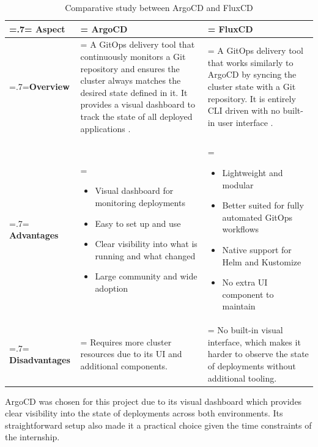 \begin{table}[H]
    \renewcommand{\arraystretch}{1.5}%
    \caption{Comparative study between ArgoCD and FluxCD}
    \centering
    \medskip
    \begin{tabularx}{1\textwidth} {
            | >{\hsize=.7\hsize\linewidth=\hsize\centering\arraybackslash}X
            | >{\hsize=1.15\hsize\linewidth=\hsize\justifying\arraybackslash}X
            | >{\hsize=1.15\hsize\linewidth=\hsize\justifying\arraybackslash}X |}
        \hline
        \rowcolor{primary} \textbf {Aspect} & \textbf{ArgoCD} & \textbf{FluxCD} \\
        \hline
        \textbf {Overview} & \noindent A GitOps delivery tool that continuously monitors a Git repository and ensures the cluster always matches the desired state defined in it. It provides a visual dashboard to track the state of all deployed applications \cite{argocd_docs}. & \noindent A GitOps delivery tool that works similarly to ArgoCD by syncing the cluster state with a Git repository. It is entirely CLI driven with no built-in user interface \cite{fluxcd_docs}. \\
        \hline
        \textbf {Advantages} & \begin{itemize}[leftmargin=*, topsep=0pt, itemsep=1pt, parsep=2pt]
            \item Visual dashboard for monitoring deployments
            \item Easy to set up and use
            \item Clear visibility into what is running and what changed
            \item Large community and wide adoption
        \end{itemize} & \begin{itemize}[leftmargin=*, topsep=0pt, itemsep=1pt, parsep=2pt]
            \item Lightweight and modular
            \item Better suited for fully automated GitOps workflows
            \item Native support for Helm and Kustomize
            \item No extra UI component to maintain
        \end{itemize} \\
        \hline
        \textbf {Disadvantages} & \noindent Requires more cluster resources due to its UI and additional components. & \noindent No built-in visual interface, which makes it harder to observe the state of deployments without additional tooling. \\
        \hline
    \end{tabularx}
\end{table}
ArgoCD \cite{argocd} was chosen for this project due to its visual dashboard which provides 
clear visibility into the state of deployments across both environments. Its 
straightforward setup also made it a practical choice given the time constraints 
of the internship.

